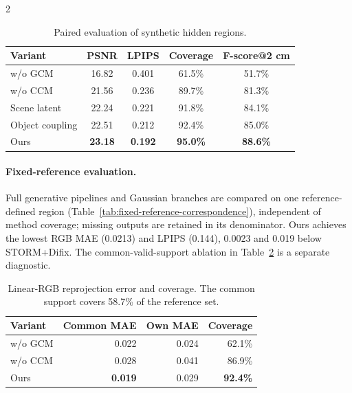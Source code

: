 \begin{multicols}{2}
\begin{table}[H]
\centering\small
\setlength{\tabcolsep}{4pt}
\caption{Paired evaluation of synthetic hidden regions.}
\label{tab:hidden-regions}
\begin{tabular}{@{}lcccc@{}}
\toprule
Variant & PSNR & LPIPS & Coverage & F-score@2 cm \\
\midrule
w/o GCM & 16.82 & 0.401 & 61.5\% & 51.7\% \\
w/o CCM & 21.56 & 0.236 & 89.7\% & 81.3\% \\
Scene latent & 22.24 & 0.221 & 91.8\% & 84.1\% \\
Object coupling & 22.51 & 0.212 & 92.4\% & 85.0\% \\
Ours & \textbf{23.18} & \textbf{0.192} & \textbf{95.0\%} & \textbf{88.6\%} \\
\bottomrule
\end{tabular}
\end{table}

\paragraph{Fixed-reference evaluation.}
Full generative pipelines and Gaussian branches are compared on one reference-defined region (Table~\ref{tab:fixed-reference-correspondence}), independent of method coverage; missing outputs are retained in its denominator. Ours achieves the lowest RGB MAE (0.0213) and LPIPS (0.144), 0.0023 and 0.019 below STORM+Difix. The common-valid-support ablation in Table~\ref{tab:reprojection} is a separate diagnostic.

\begin{table}[H]
\centering\small
\caption{Linear-RGB reprojection error and coverage. The common support covers 58.7\% of the reference set.}
\label{tab:reprojection}
\begin{tabular}{@{}lrrr@{}}
\toprule
Variant & Common MAE & Own MAE & Coverage \\
\midrule
w/o GCM & 0.022 & 0.024 & 62.1\% \\
w/o CCM & 0.028 & 0.041 & 86.9\% \\
Ours & \textbf{0.019} & 0.029 & \textbf{92.4\%} \\
\bottomrule
\end{tabular}
\end{table}


\end{multicols}
